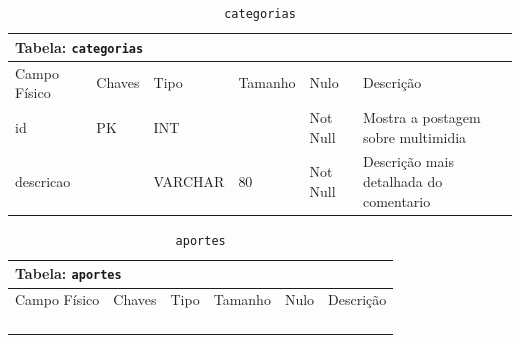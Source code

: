 \documentclass[12pt,a4paper]{article}
\begin{document}
\begin{center}
\begin{table}[h!]
	\caption{\texttt{categorias}}
	\label{tabela:categorias}
	\begin{tabular}{|p{2.3cm}|p{1.2cm}|p{1.8cm}|p{1.5cm}|p{1cm}|p{6cm}|}\hline	
		\multicolumn{6}{|p{16cm}|}{\cellcolor{cinzaClaro}  \centering Tabela: \texttt{categorias}} \\ \hline %
		{\small Campo Físico}   & {\small Chaves} & {\small Tipo} & {\small Tamanho} & {\small Nulo} & {\small Descrição}\\\hline %
		
		{\tiny id} & {\tiny PK} & {\tiny INT} & {\tiny } & {\tiny Not Null} &{\tiny Mostra a postagem sobre multimidia}\\\hline
		{\tiny descricao} & {\tiny } & {\tiny VARCHAR} & {\tiny 80} & {\tiny Not Null} &{\tiny Descrição mais detalhada do comentario}\\\hline
		
			
	\end{tabular}
\end{table}	
\end{center}

\begin{center}
\begin{table}[h!]
	\caption{\texttt{aportes}}
	\label{tabela:aportes}
	\begin{tabular}{|p{2.3cm}|p{1.2cm}|p{1.8cm}|p{1.5cm}|p{1cm}|p{6cm}|}\hline	
		\multicolumn{6}{|p{16cm}|}{\cellcolor{cinzaClaro}  \centering Tabela: \texttt{aportes}} \\ \hline %
		{\small Campo Físico}   & {\small Chaves} & {\small Tipo} & {\small Tamanho} & {\small Nulo} & {\small Descrição}\\\hline %
		
		{\tiny } & {\tiny } & {\tiny } & {\tiny } & {\tiny } &{\tiny }\\\hline
		{\tiny } & {\tiny } & {\tiny } & {\tiny } & {\tiny } &{\tiny }\\\hline
		{\tiny } & {\tiny } & {\tiny } & {\tiny } & {\tiny } &{\tiny }\\\hline
		{\tiny } & {\tiny } & {\tiny } & {\tiny } & {\tiny } &{\tiny }\\\hline
			
	\end{tabular}
\end{table}	
\end{center}
\end{document}
